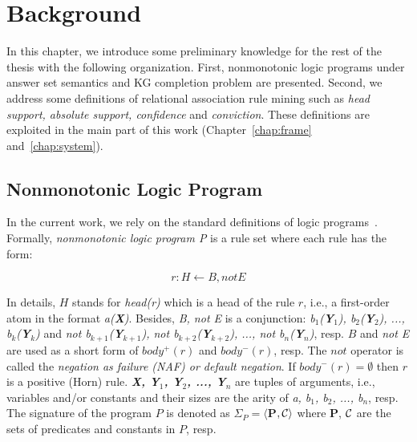 \chapter{Background}
\label{chap:back}

In this chapter, we introduce some preliminary knowledge for the rest of the thesis with the following organization. First, nonmonotonic logic programs under answer set semantics and KG completion problem are presented. Second, we address some definitions of relational association rule mining such as \textit{head support, absolute support, confidence} and \textit{conviction}. These definitions are exploited in the main part of this work (Chapter~\ref{chap:frame} and~\ref{chap:system}).

\section{Nonmonotonic Logic Program}

In the current work, we rely on the standard definitions of logic programs~\cite{ref49}. Formally, \textit{nonmonotonic logic program P} is a rule set where each rule has the form:

\begin{equation}
r: H \leftarrow B, not E
\end{equation}
\label{rule3}

In details, $H$ stands for \textit{head(r)} which is a head of the rule $r$, i.e., a first-order atom in the format \textit{a(\textbf{X})}. Besides, \textit{B, not E} is a conjunction: \textit{b$_1$(\textbf{Y}$_1$), b$_2$(\textbf{Y}$_2$), ..., b$_k$(\textbf{Y}$_k$)} and \textit{not b$_{k+1}$(\textbf{Y}$_{k+1}$), not b$_{k+2}$(\textbf{Y}$_{k+2}$), ..., not b$_n$(\textbf{Y}$_n$)}, resp. $B$ and \textit{not E} are used as a short form of $body^+(r)$ and $body^-(r)$, resp. The $not$ operator is called the \textit{negation as failure (NAF) or default negation}. If $body^-(r) = \emptyset$ then $r$ is a positive (Horn) rule. \textit{\textbf{X, Y$_{1}$, Y$_{2}$, ..., Y$_{n}$}} are tuples of arguments, i.e., variables and/or constants and their sizes are the arity of \textit{a, b$_1$, b$_2$, ..., b$_n$}, resp. The signature of the program $P$ is denoted as $\Sigma_{P} = \langle$\textbf{P}$, \mathcal{C}\rangle$ where \textbf{P}, $\mathcal{C}$ are the sets of predicates and constants in $P$, resp.


